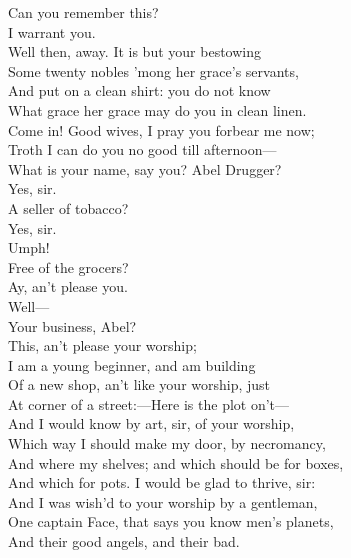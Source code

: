 \documentclass[a4paper,oneside]{memoir}
\begin{document}
\begin{drama*}
\facespeaks Can you remember this?\\
\dapperspeaks {} I warrant you.\\
\facespeaks Well then, away. It is but your bestowing\\
Some twenty nobles 'mong her grace's servants,\\
And put on a clean shirt: you do not know\\
What grace her grace may do you in clean linen.\\
\subtlespeaks {} Come in! Good wives, I pray you forbear me now;\\
Troth I can do you no good till afternoon---\\
What is your name, say you? Abel Drugger?\\
\druggerspeaks Yes, sir.\\
\subtlespeaks {} A seller of tobacco?\\
\druggerspeaks {} Yes, sir.\\
\subtlespeaks {} Umph!\\
Free of the grocers?\\
\druggerspeaks {} Ay, an't please you.\\
\subtlespeaks {} Well---\\
Your business, Abel?\\
\druggerspeaks {} This, an't please your worship;\\
I am a young beginner, and am building\\
Of a new shop, an't like your worship, just\\
At corner of a street:---Here is the plot on't---\\
And I would know by art, sir, of your worship,\\
Which way I should make my door, by necromancy,\\
And where my shelves; and which should be for boxes,\\
And which for pots. I would be glad to thrive, sir:\\
And I was wish'd to your worship by a gentleman,\\
One captain Face, that says you know men's planets,\\
And their good angels, and their bad.\\

\end{drama*}
\end{document}
